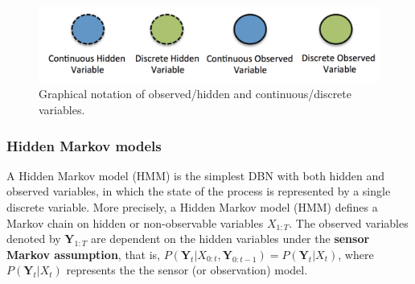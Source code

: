 

\begin{figure}
\begin{center}
\includegraphics[scale=0.4]{./figures/PreliminariesNotation}
\caption{\label{Figure:PreliminariesNotation}Graphical notation of observed/hidden and continuous/discrete variables.
}
\end{center}
\end{figure}


\subsubsection{Hidden Markov models}
A Hidden Markov model (HMM) is the simplest DBN with both hidden and observed variables, in which the state of the process is represented by a single discrete variable. More precisely, a Hidden Markov model (HMM) defines a Markov chain on hidden or non-observable variables $X_{1:T}$. The observed variables denoted by $\bm Y_{1:T}$ are dependent on the hidden variables under the \textbf{sensor Markov assumption}, that is, $P(\bm Y_t| X_{0:t}, \bm Y_{0:t-1}) = P(\bm Y_t| X_t)$, where $P(\bm Y_t| X_t)$ represents the the sensor (or observation) model.  


